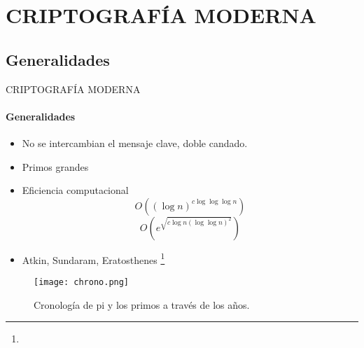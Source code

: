 \section{CRIPTOGRAFÍA MODERNA}
\subsection{Generalidades}
\begin{frame}{CRIPTOGRAFÍA MODERNA}
\framesubtitle{Generalidades}
	\begin{itemize}
      \item No se intercambian el mensaje clave, doble candado.
      \item Primos grandes
      \item Eficiencia computacional
      	\begin{equation*}
      		O((\log n)^{c\log\log\log n})
      	\end{equation*}
        \begin{equation*}
        	O(e^{\sqrt{c\log n(\log\log n)^2}})
        \end{equation*}
      \item Atkin, Sundaram, Eratosthenes \vspace{0.35cm}\footnote{}
	\end{itemize}
    \begin{figure}
    	\centering
        \texttt{[image: chrono.png]}
        \caption{Cronología de pi y los primos a través de los años\footnotemark{}.}
    \end{figure}
    \vspace{-12mm}
\end{frame}
